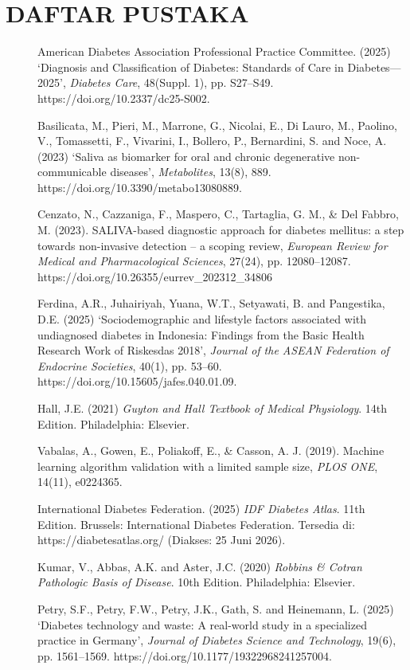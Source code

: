 \documentclass[12pt,a4paper]{article}
\begin{document}
\section*{DAFTAR PUSTAKA}

\begin{description}
    \item[] American Diabetes Association Professional Practice Committee. (2025) `Diagnosis and Classification of Diabetes: Standards of Care in Diabetes—2025', \textit{Diabetes Care}, 48(Suppl. 1), pp. S27–S49. https://doi.org/10.2337/dc25-S002.

    \item[] Basilicata, M., Pieri, M., Marrone, G., Nicolai, E., Di Lauro, M., Paolino, V., Tomassetti, F., Vivarini, I., Bollero, P., Bernardini, S. and Noce, A. (2023) `Saliva as biomarker for oral and chronic degenerative non-communicable diseases', \textit{Metabolites}, 13(8), 889. https://doi.org/10.3390/metabo13080889.

    \item[] Cenzato, N., Cazzaniga, F., Maspero, C., Tartaglia, G. M., \& Del Fabbro, M. (2023). SALIVA-based diagnostic approach for diabetes mellitus: a step towards non-invasive detection -- a scoping review, \textit{European Review for Medical and Pharmacological Sciences}, 27(24), pp. 12080--12087. https://doi.org/10.26355/eurrev\_202312\_34806

    \item[] Ferdina, A.R., Juhairiyah, Yuana, W.T., Setyawati, B. and Pangestika, D.E. (2025) `Sociodemographic and lifestyle factors associated with undiagnosed diabetes in Indonesia: Findings from the Basic Health Research Work of Riskesdas 2018', \textit{Journal of the ASEAN Federation of Endocrine Societies}, 40(1), pp. 53--60. https://doi.org/10.15605/jafes.040.01.09.

    \item[] Hall, J.E. (2021) \textit{Guyton and Hall Textbook of Medical Physiology}. 14th Edition. Philadelphia: Elsevier.

    \item[] Vabalas, A., Gowen, E., Poliakoff, E., \& Casson, A. J. (2019). Machine learning algorithm validation with a limited sample size, \textit{PLOS ONE}, 14(11), e0224365.

    \item[] International Diabetes Federation. (2025) \textit{IDF Diabetes Atlas}. 11th Edition. Brussels: International Diabetes Federation. Tersedia di: https://diabetesatlas.org/ (Diakses: 25 Juni 2026).

    \item[] Kumar, V., Abbas, A.K. and Aster, J.C. (2020) \textit{Robbins \& Cotran Pathologic Basis of Disease}. 10th Edition. Philadelphia: Elsevier.

    \item[] Petry, S.F., Petry, F.W., Petry, J.K., Gath, S. and Heinemann, L. (2025) `Diabetes technology and waste: A real-world study in a specialized practice in Germany', \textit{Journal of Diabetes Science and Technology}, 19(6), pp. 1561--1569. https://doi.org/10.1177/19322968241257004.
\end{description}
\end{document}
